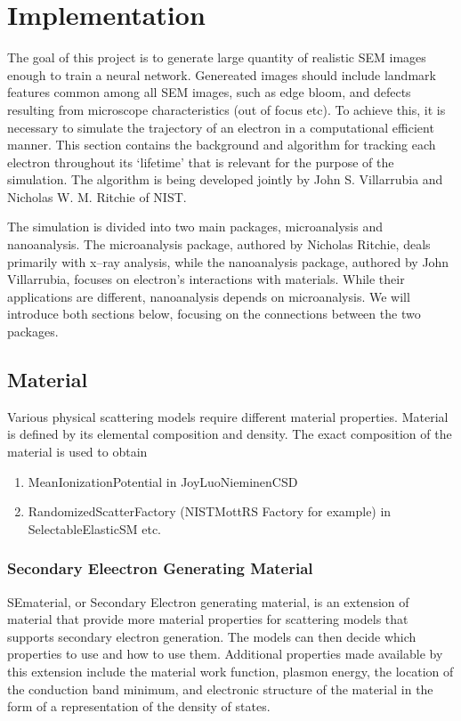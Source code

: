 \chapter{Implementation}\label{impl}
The goal of this project is to generate large quantity of realistic SEM images enough to train a neural network. Genereated images should include landmark features common among all SEM images, such as edge bloom, and defects resulting from microscope characteristics (out of focus etc). To achieve this, it is necessary to simulate the trajectory of an electron in a computational efficient manner. This section contains the background and algorithm for tracking each electron throughout its `lifetime' that is relevant for the purpose of the simulation. The algorithm is being developed jointly by John S. Villarrubia and Nicholas W. M. Ritchie of NIST. 

The simulation is divided into two main packages, microanalysis and nanoanalysis. The microanalysis package, authored by Nicholas Ritchie, deals primarily with x--ray analysis, while the nanoanalysis package, authored by John Villarrubia, focuses on electron's interactions with materials. While their applications are different, nanoanalysis depends on microanalysis. We will introduce both sections below, focusing on the connections between the two packages.

\section{Material}\label{impl:material}
Various physical scattering models require different material properties. Material is defined by its elemental composition and density. The exact composition of the material is used to obtain 
\begin{enumerate}
\item MeanIonizationPotential in JoyLuoNieminenCSD
\item RandomizedScatterFactory (NISTMottRS Factory for example) in SelectableElasticSM etc.
\end{enumerate}

\subsection{Secondary Eleectron Generating Material}\label{subimpl:sematerial}
SEmaterial, or Secondary Electron generating material, is an extension of material that provide more material properties for scattering models that supports secondary electron generation. The models can then decide which properties to use and how to use them. Additional properties made available by this extension include the material work function, plasmon energy, the location of the conduction band minimum, and electronic structure of the material in the form of a representation of the density of states. 

